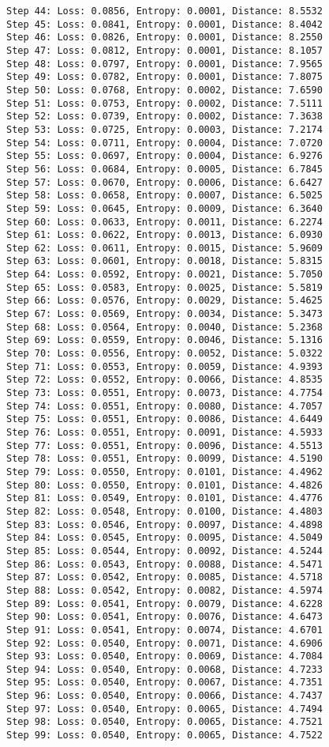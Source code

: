 \documentclass[11pt]{article}
\begin{document}
\begin{Verbatim}[commandchars=\\\{\}]
Step 44: Loss: 0.0856, Entropy: 0.0001, Distance: 8.5532
Step 45: Loss: 0.0841, Entropy: 0.0001, Distance: 8.4042
Step 46: Loss: 0.0826, Entropy: 0.0001, Distance: 8.2550
Step 47: Loss: 0.0812, Entropy: 0.0001, Distance: 8.1057
Step 48: Loss: 0.0797, Entropy: 0.0001, Distance: 7.9565
Step 49: Loss: 0.0782, Entropy: 0.0001, Distance: 7.8075
Step 50: Loss: 0.0768, Entropy: 0.0002, Distance: 7.6590
Step 51: Loss: 0.0753, Entropy: 0.0002, Distance: 7.5111
Step 52: Loss: 0.0739, Entropy: 0.0002, Distance: 7.3638
Step 53: Loss: 0.0725, Entropy: 0.0003, Distance: 7.2174
Step 54: Loss: 0.0711, Entropy: 0.0004, Distance: 7.0720
Step 55: Loss: 0.0697, Entropy: 0.0004, Distance: 6.9276
Step 56: Loss: 0.0684, Entropy: 0.0005, Distance: 6.7845
Step 57: Loss: 0.0670, Entropy: 0.0006, Distance: 6.6427
Step 58: Loss: 0.0658, Entropy: 0.0007, Distance: 6.5025
Step 59: Loss: 0.0645, Entropy: 0.0009, Distance: 6.3640
Step 60: Loss: 0.0633, Entropy: 0.0011, Distance: 6.2274
Step 61: Loss: 0.0622, Entropy: 0.0013, Distance: 6.0930
Step 62: Loss: 0.0611, Entropy: 0.0015, Distance: 5.9609
Step 63: Loss: 0.0601, Entropy: 0.0018, Distance: 5.8315
Step 64: Loss: 0.0592, Entropy: 0.0021, Distance: 5.7050
Step 65: Loss: 0.0583, Entropy: 0.0025, Distance: 5.5819
Step 66: Loss: 0.0576, Entropy: 0.0029, Distance: 5.4625
Step 67: Loss: 0.0569, Entropy: 0.0034, Distance: 5.3473
Step 68: Loss: 0.0564, Entropy: 0.0040, Distance: 5.2368
Step 69: Loss: 0.0559, Entropy: 0.0046, Distance: 5.1316
Step 70: Loss: 0.0556, Entropy: 0.0052, Distance: 5.0322
Step 71: Loss: 0.0553, Entropy: 0.0059, Distance: 4.9393
Step 72: Loss: 0.0552, Entropy: 0.0066, Distance: 4.8535
Step 73: Loss: 0.0551, Entropy: 0.0073, Distance: 4.7754
Step 74: Loss: 0.0551, Entropy: 0.0080, Distance: 4.7057
Step 75: Loss: 0.0551, Entropy: 0.0086, Distance: 4.6449
Step 76: Loss: 0.0551, Entropy: 0.0091, Distance: 4.5933
Step 77: Loss: 0.0551, Entropy: 0.0096, Distance: 4.5513
Step 78: Loss: 0.0551, Entropy: 0.0099, Distance: 4.5190
Step 79: Loss: 0.0550, Entropy: 0.0101, Distance: 4.4962
Step 80: Loss: 0.0550, Entropy: 0.0101, Distance: 4.4826
Step 81: Loss: 0.0549, Entropy: 0.0101, Distance: 4.4776
Step 82: Loss: 0.0548, Entropy: 0.0100, Distance: 4.4803
Step 83: Loss: 0.0546, Entropy: 0.0097, Distance: 4.4898
Step 84: Loss: 0.0545, Entropy: 0.0095, Distance: 4.5049
Step 85: Loss: 0.0544, Entropy: 0.0092, Distance: 4.5244
Step 86: Loss: 0.0543, Entropy: 0.0088, Distance: 4.5471
Step 87: Loss: 0.0542, Entropy: 0.0085, Distance: 4.5718
Step 88: Loss: 0.0542, Entropy: 0.0082, Distance: 4.5974
Step 89: Loss: 0.0541, Entropy: 0.0079, Distance: 4.6228
Step 90: Loss: 0.0541, Entropy: 0.0076, Distance: 4.6473
Step 91: Loss: 0.0541, Entropy: 0.0074, Distance: 4.6701
Step 92: Loss: 0.0540, Entropy: 0.0071, Distance: 4.6906
Step 93: Loss: 0.0540, Entropy: 0.0069, Distance: 4.7084
Step 94: Loss: 0.0540, Entropy: 0.0068, Distance: 4.7233
Step 95: Loss: 0.0540, Entropy: 0.0067, Distance: 4.7351
Step 96: Loss: 0.0540, Entropy: 0.0066, Distance: 4.7437
Step 97: Loss: 0.0540, Entropy: 0.0065, Distance: 4.7494
Step 98: Loss: 0.0540, Entropy: 0.0065, Distance: 4.7521
Step 99: Loss: 0.0540, Entropy: 0.0065, Distance: 4.7522
    \end{Verbatim}
\end{document}
